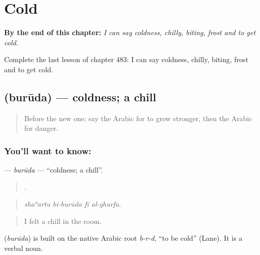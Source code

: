 
\chapter{Cold}
\label{ch:ar-cold}

\begin{chapteropening}
\textbf{By the end of this chapter:} \emph{I can say coldness, chilly, biting, frost and to get cold.}

Complete the last lesson of chapter 483: I can say coldness, chilly, biting, frost and to get cold.
\end{chapteropening}

\section[\texorpdfstring{\ar{برودة} (burūda)}{برودة (burūda)}]{ (burūda) — coldness; a chill}

\label{lesson:AR-C483-buruda}



\begin{quote}
Before the new one: say the Arabic for to grow stronger, then the Arabic for danger.
\end{quote}

\subsection*{You'll want to know: }
\textbf{} — \emph{burūda} — \textquotedblleft{}coldness; a chill\textquotedblright{}.

\begin{quote}
   .
\end{quote}

\begin{quote}
\emph{shaʿartu bi-burūda fī al-ghurfa.}
\end{quote}

\begin{quote}
I felt a chill in the room.
\end{quote}

\begin{cousinweb}
\textbf{} (\emph{burūda}) is built on the native Arabic root \emph{b-r-d}, \textquotedblleft{}to be cold\textquotedblright{} (Lane). It is a verbal noun.
\end{cousinweb}

